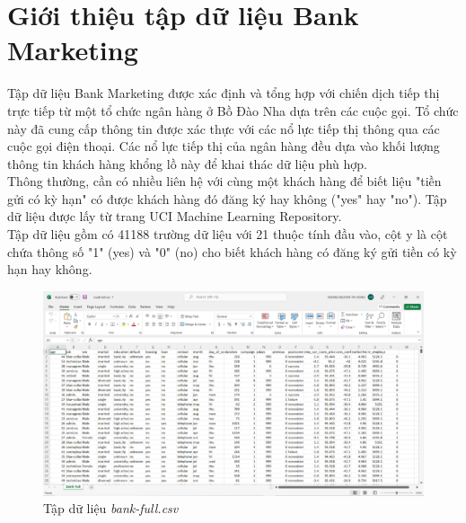 \documentclass{report}
\begin{document}
\section{Giới thiệu tập dữ liệu Bank Marketing}
     \fontsize{13}{14}\selectfont
     Tập dữ liệu Bank Marketing được xác định và tổng hợp với chiến dịch tiếp thị trực tiếp từ một tổ chức ngân hàng ở Bồ Đào Nha dựa trên các cuộc gọi. Tổ chức này đã cung cấp thông tin được xác thực với các nổ lực tiếp thị thông qua các cuộc gọi điện thoại. Các nổ lực tiếp thị của ngân hàng đều dựa vào khối lượng thông tin khách hàng khổng lồ này để khai thác dữ liệu phù hợp. \\
     \indent Thông thường, cần có nhiều liên hệ với cùng một khách hàng để biết liệu "tiền gửi có kỳ hạn" có được khách hàng đó đăng ký hay không ("yes" hay "no"). Tập dữ liệu được lấy từ trang UCI Machine Learning Repository.\\
     \indent Tập dữ liệu gồm có 41188 trường dữ liệu với 21 thuộc tính đầu vào, cột y là cột chứa thông số "1" (yes) và "0" (no) cho biết khách hàng có đăng ký gửi tiền có kỳ hạn hay không.\\
    \pagebreak
     \begin{center}
        \begin{figure}[htp]
    	\begin{center}
    		\includegraphics[scale = 0.5]{images/dataset.png}
    	\end{center}
    		\caption{Tập dữ liệu \textit{bank-full.csv}}
    \end{figure}
    \end{center}
\fontsize{14}{10}\selectfont
\end{document}
